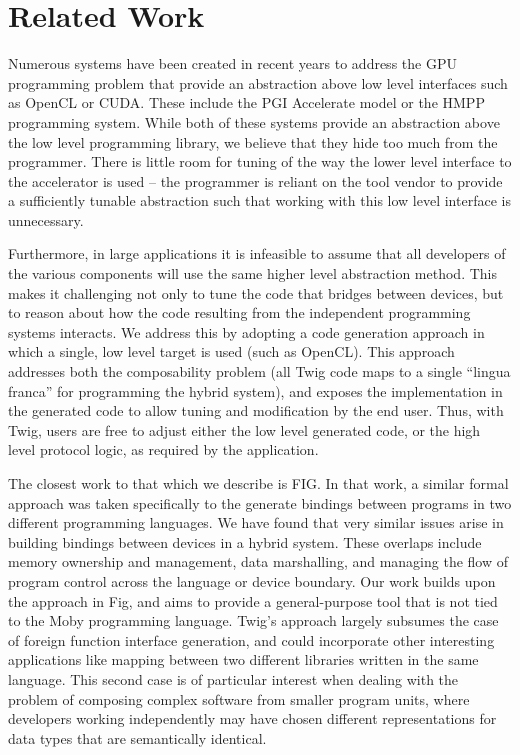 
\section{Related Work}

Numerous systems have been created in recent years to address the GPU programming problem that provide an abstraction above low level interfaces such as OpenCL or CUDA. These include the PGI Accelerate model\cite{pgi-accelerate} or the HMPP programming system\cite{hmpp}. While both of these systems provide an abstraction above the low level programming library, we believe that they hide too much from the programmer. There is little room for tuning of the way the lower level interface to the accelerator is used -- the programmer is reliant on the tool vendor to provide a sufficiently tunable abstraction such that working with this low level interface is unnecessary.

Furthermore, in large applications it is infeasible to assume that all developers of the various components will use the same higher level abstraction method. This makes it challenging not only to tune the code that bridges between devices, but to reason about how the code resulting from the independent programming systems interacts. We address this by adopting a code generation approach in which a single, low level target is used (such as OpenCL). This approach addresses both the composability problem (all Twig code maps to a single ``lingua franca'' for programming the hybrid system), and exposes the implementation in the generated code to allow tuning and modification by the end user. Thus, with Twig, users are free to adjust either the low level generated code, or the high level protocol logic, as required by the application.

The closest work to that which we describe is FIG\cite{fig}. In that work, a similar formal approach was taken specifically to the generate bindings between programs in two different programming languages. We have found that very similar issues arise in building bindings between devices in a hybrid system. These overlaps include memory ownership and management, data marshalling, and managing the flow of program control across the language or device boundary. Our work builds upon the approach in Fig, and aims to provide a general-purpose tool that is not tied to the Moby programming language. Twig's approach largely subsumes the case of foreign function interface generation, and could incorporate other interesting applications like mapping between two different libraries written in the same language. This second case is of particular interest when dealing with the problem of composing complex software from smaller program units, where developers working independently may have chosen different representations for data types that are semantically identical.

